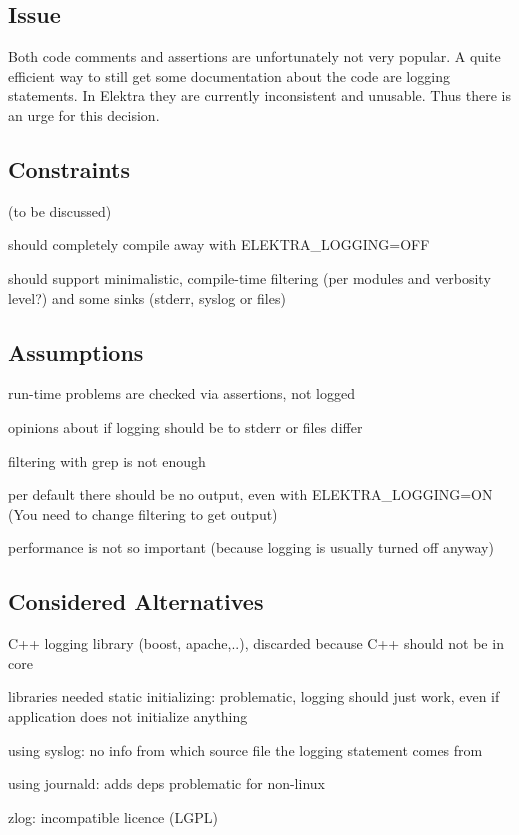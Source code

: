 \subsection*{Issue}

Both code comments and assertions are unfortunately not very popular. A quite efficient way to still get some documentation about the code are logging statements. In Elektra they are currently inconsistent and unusable. Thus there is an urge for this decision.

\subsection*{Constraints}

(to be discussed)


\begin{DoxyItemize}
\item should completely compile away with E\+L\+E\+K\+T\+R\+A\+\_\+\+L\+O\+G\+G\+I\+N\+G=O\+F\+F
\item should support minimalistic, compile-\/time filtering (per modules and verbosity level?) and some sinks (stderr, syslog or files)
\end{DoxyItemize}

\subsection*{Assumptions}


\begin{DoxyItemize}
\item run-\/time problems are checked via assertions, not logged
\item opinions about if logging should be to stderr or files differ
\item filtering with grep is not enough
\item per default there should be no output, even with E\+L\+E\+K\+T\+R\+A\+\_\+\+L\+O\+G\+G\+I\+N\+G=O\+N (You need to change filtering to get output)
\item performance is not so important (because logging is usually turned off anyway)
\end{DoxyItemize}

\subsection*{Considered Alternatives}


\begin{DoxyItemize}
\item C++ logging library (boost, apache,..), discarded because C++ should not be in core
\item libraries needed static initializing\+: problematic, logging should just work, even if application does not initialize anything
\item using syslog\+: no info from which source file the logging statement comes from
\item using journald\+: adds deps problematic for non-\/linux
\item zlog\+: incompatible licence (L\+G\+P\+L)
\end{DoxyItemize}

